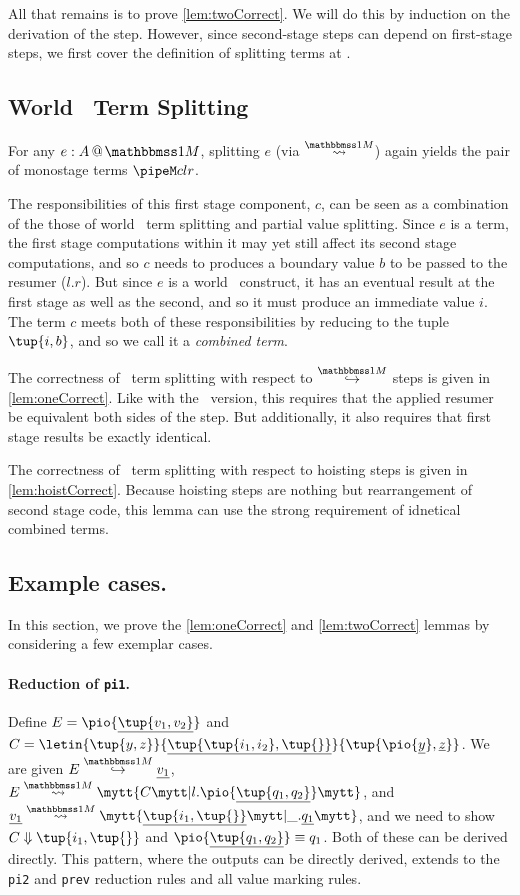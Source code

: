 \begin{abstrsyn}
All that remains is to prove \ref{lem:twoCorrect}.  
We will do this by induction on the derivation of the step.
However, since second-stage steps can depend on first-stage steps,
we first cover the definition of splitting terms at \bbonem.

\subsection{World \bbonem\ Term Splitting}

For any $\colmix e A$, 
splitting $e$ (via $\splitonesym$) again 
yields the pair of monostage terms $\pipeM c l r$. 

The responsibilities of this first stage component, $c$, can be seen as a combination of the
those of world \bbtwo\ term splitting and partial value splitting.
Since $e$ is a term, the first stage computations within it may yet still
affect its second stage computations,
and so $c$ needs to produces a boundary value $b$ to be passed to the resumer ($l.r$).
But since $e$ is a world \bbonem\ construct, it has an eventual result at the 
first stage as well as the second, and so it must produce an immediate value $i$.
The term $c$ meets both of these responsibilities by reducing to the tuple $\tup{i,b}$,
and so we call it a {\em combined term}.

The correctness of \bbonem\ term splitting with respect to $\stepsym \bbonem$ steps is given in \ref{lem:oneCorrect}.
Like with the \bbtwo\ version, this requires that the applied resumer be equivalent both sides of the step.
But additionally, it also requires that first stage results be exactly identical.

The correctness of \bbonem\ term splitting with respect to hoisting steps is given in \ref{lem:hoistCorrect}.
Because hoisting steps are nothing but rearrangement of second stage code,
this lemma can use the strong requirement of idnetical combined terms.

\subsection{Example cases.}

In this section, we prove the \ref{lem:oneCorrect} and \ref{lem:twoCorrect} lemmas
by considering a few exemplar cases.


\paragraph{Reduction of {\tt pi1}.}
Define $E = \pio {\exv{\tup {v_1,v_2}}}$ and  
$C = \letin{\tup{y,z}}{\exv{\tup{\tup {i_1,i_2},\tup{}}}}{\tup{\pio {\exv y},\exv z}}$.
We are given $\stepmix  E {\exv {v_1}}$,
$\splitone E A C {l.\pio {\exv {\tup{q_1,q_2}}}}$, and
$\splitone {\exv {v_1}} A {\exv {\tup{i_1,\tup{}}}} {\_.\exv{q_1}}$,
and we need to show $\reduce C {\tup {i_1,\tup{}}}$
and $\pio {\exv {\tup{q_1,q_2}}} \equiv q_1$.
Both of these can be derived directly.
This pattern, where the outputs can be directly derived, extends to the {\tt pi2} and {\tt prev} reduction rules and all value marking rules.


\end{abstrsyn}

